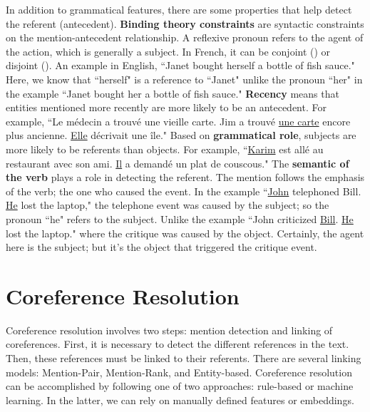 \documentclass{KBook}
\begin{document}
In addition to grammatical features, there are some properties that help detect the referent (antecedent). \textbf{Binding theory constraints} are syntactic constraints on the mention-antecedent relationship. A reflexive pronoun refers to the agent of the action, which is generally a subject. In French, it can be conjoint () or disjoint (). An example in English, ``Janet bought herself a bottle of fish sauce." Here, we know that ``herself" is a reference to ``Janet" unlike the pronoun ``her" in the example ``Janet bought her a bottle of fish sauce." \textbf{Recency} means that entities mentioned more recently are more likely to be an antecedent. For example, ``Le médecin a trouvé une vieille carte. Jim a trouvé \underline{une carte} encore plus ancienne. \underline{Elle} décrivait une île." Based on \textbf{grammatical role}, subjects are more likely to be referents than objects. For example, ``\underline{Karim} est allé au restaurant avec son ami. \underline{Il} a demandé un plat de couscous." The \textbf{semantic of the verb} plays a role in detecting the referent. The mention follows the emphasis of the verb; the one who caused the event. In the example ``\underline{John} telephoned Bill. \underline{He} lost the laptop," the telephone event was caused by the subject; so the pronoun ``he" refers to the subject. Unlike the example ``John criticized \underline{Bill}. \underline{He} lost the laptop." where the critique was caused by the object. Certainly, the agent here is the subject; but it's the object that triggered the critique event.


\section{Coreference Resolution}

Coreference resolution involves two steps: mention detection and linking of coreferences. First, it is necessary to detect the different references in the text. Then, these references must be linked to their referents. There are several linking models: Mention-Pair, Mention-Rank, and Entity-based. Coreference resolution can be accomplished by following one of two approaches: rule-based or machine learning. In the latter, we can rely on manually defined features or embeddings.
\end{document}
